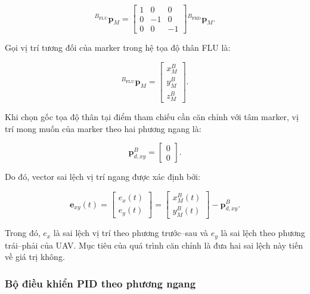 \begin{equation}
{}^{B_{\mathrm{FLU}}}\mathbf{p}_{M}
=
\begin{bmatrix}
1&0&0\\
0&-1&0\\
0&0&-1
\end{bmatrix}
{}^{B_{\mathrm{FRD}}}\mathbf{p}_{M}.
\label{eq:body_frd_to_flu}
\end{equation}

Gọi vị trí tương đối của marker trong hệ tọa độ
thân FLU là:

\begin{equation}
{}^{B_{\mathrm{FLU}}}\mathbf{p}_{M}
=
\begin{bmatrix}
x_M^B\\
y_M^B\\
z_M^B
\end{bmatrix}.
\label{eq:marker_body_position_control}
\end{equation}

Khi chọn gốc tọa độ thân tại điểm tham chiếu
cần căn chỉnh với tâm marker, vị trí mong muốn
của marker theo hai phương ngang là:

\begin{equation}
\mathbf{p}_{d,xy}^{B}
=
\begin{bmatrix}
0\\
0
\end{bmatrix}.
\label{eq:desired_marker_position}
\end{equation}

Do đó, vector sai lệch vị trí ngang được xác định bởi:

\begin{equation}
\mathbf{e}_{xy}(t)
=
\begin{bmatrix}
e_x(t)\\
e_y(t)
\end{bmatrix}
=
\begin{bmatrix}
x_M^B(t)\\
y_M^B(t)
\end{bmatrix}
-
\mathbf{p}_{d,xy}^{B}.
\label{eq:landing_horizontal_error}
\end{equation}

Trong đó, $e_x$ là sai lệch vị trí theo phương
trước--sau và $e_y$ là sai lệch theo phương
trái--phải của UAV. Mục tiêu của quá trình
căn chỉnh là đưa hai sai lệch này tiến về
giá trị không.

\subsubsection{Bộ điều khiển PID theo phương ngang}

